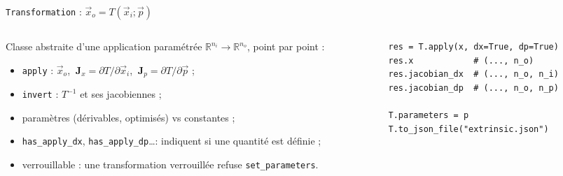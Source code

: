 \documentclass[aspectratio=169,11pt]{beamer}
\newcommand{\code}[1]{\texttt{\small #1}}
\begin{document}
\begin{frame}[fragile]{\texttt{Transformation} : $\vec{x}_o = T(\vec{x}_i ; \vec{p})$}
  \begin{columns}[T]
    \begin{column}{0.50\textwidth}\small
      Classe abstraite d'une application paramétrée
      $\mathbb{R}^{n_i} \to \mathbb{R}^{n_o}$, point par point :
      \begin{itemize}
        \item \code{apply} : $\vec{x}_o$, $\ \mathbf{J}_x = \partial T / \partial \vec{x}_i$,
              $\ \mathbf{J}_p = \partial T / \partial \vec{p}$ ;
        \item \code{invert} : $T^{-1}$ et ses jacobiennes ;
        \item \alert{paramètres} (dérivables, optimisés) vs \alert{constantes} ;
        \item \code{has\_apply\_dx}, \code{has\_apply\_dp}\dots : indiquent si une
              quantité est définie ;
        \item \alert{verrouillable} : une transformation verrouillée refuse
              \code{set\_parameters}.
      \end{itemize}
    \end{column}
    \begin{column}{0.48\textwidth}
\begin{lstlisting}
res = T.apply(x, dx=True, dp=True)
res.x            # (..., n_o)
res.jacobian_dx  # (..., n_o, n_i)
res.jacobian_dp  # (..., n_o, n_p)
 
T.parameters = p
T.to_json_file("extrinsic.json")
\end{lstlisting}
    \end{column}
  \end{columns}
\end{frame}
 
\end{document}
